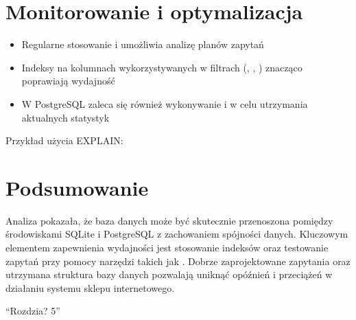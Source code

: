 \documentclass[letterpaper,10pt,english]{sphinxmanual}
\begin{document}
\section{Monitorowanie i optymalizacja}
\label{\detokenize{rozdzial4/index:monitorowanie-i-optymalizacja}}\begin{itemize}
\item {} 
\sphinxAtStartPar
Regularne stosowanie  i  umożliwia analizę planów zapytań

\item {} 
\sphinxAtStartPar
Indeksy na kolumnach wykorzystywanych w filtrach (, , ) znacząco poprawiają wydajność

\item {} 
\sphinxAtStartPar
W PostgreSQL zaleca się również wykonywanie  i  w celu utrzymania aktualnych statystyk

\end{itemize}

\sphinxAtStartPar
Przykład użycia EXPLAIN:

\begin{sphinxVerbatim}[commandchars=\\\{\}]

\end{sphinxVerbatim}


\section{Podsumowanie}
\label{\detokenize{rozdzial4/index:podsumowanie}}
\sphinxAtStartPar
Analiza pokazała, że baza danych może być skutecznie przenoszona pomiędzy środowiskami SQLite i PostgreSQL z zachowaniem spójności danych. Kluczowym elementem zapewnienia wydajności jest stosowanie indeksów oraz testowanie zapytań przy pomocy narzędzi takich jak . Dobrze zaprojektowane zapytania oraz utrzymana struktura bazy danych pozwalają uniknąć opóźnień i przeciążeń w działaniu systemu sklepu internetowego.

\sphinxstepscope

\sphinxAtStartPar
“Rozdzia? 5”



\renewcommand{\indexname}{Index}
\printindex
\end{document}
